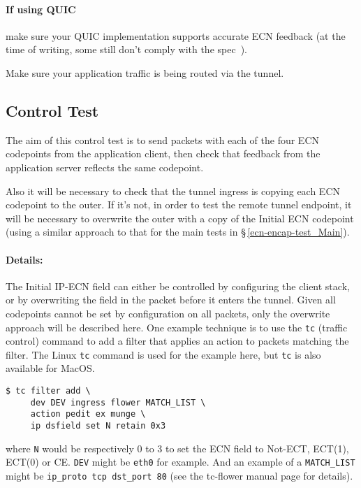 \paragraph{If using QUIC} make sure your QUIC implementation supports accurate
ECN feedback (at the time of writing, some still don't comply with the
spec~\cite{Iyengar21:QUIC}).

Make sure your application traffic is being routed via the tunnel.

\subsection{Control Test}\label{ecn-encap-test_Control}

The aim of this control test is to send packets with each of the four ECN
codepoints from the application client, then check that feedback from the
application server reflects the same codepoint.

Also it will be necessary to check that the tunnel ingress is copying each ECN
codepoint to the outer. If it's not, in order to test the remote tunnel
endpoint, it will be necessary to overwrite the outer with a copy of the Initial
ECN codepoint (using a similar approach to that for the main tests in
\S\,\ref{ecn-encap-test_Main}).

\paragraph{Details:} The Initial IP-ECN field can either be controlled by
configuring the client stack, or by overwriting the field in the packet before
it enters the tunnel. Given all codepoints cannot be set by configuration on all
packets, only the overwrite approach will be described here. One example
technique is to use the \texttt{tc} (traffic control) command to add a filter
that applies an action to packets matching the filter. The Linux \texttt{tc}
command is used for the example here, but  \texttt{tc} is also available for
MacOS.

\begin{verbatim}
$ tc filter add \
     dev DEV ingress flower MATCH_LIST \
     action pedit ex munge \
     ip dsfield set N retain 0x3
\end{verbatim}
where \texttt{N} would be respectively 0 to 3 to set the ECN field to Not-ECT,
ECT(1), ECT(0) or CE. \texttt{DEV} might be \texttt{eth0} for example. And an
example of a \texttt{MATCH\_LIST} might be \texttt{ip\_proto tcp dst\_port 80}
(see the tc-flower manual page for details).

